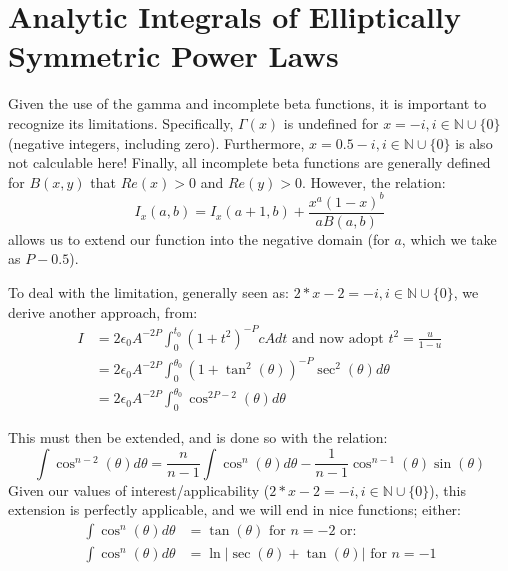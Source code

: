 \documentclass[twocolumn,traditabstract]{aa}
\begin{document}
\appendix

\section{Analytic Integrals of Elliptically Symmetric Power Laws}
\label{sec:analytic_integrals}

Given the use of the gamma and incomplete beta functions, it is important to recognize its limitations.
Specifically, $\Gamma(x)$ is undefined for $x = -i, i \in \mathbb{N} \cup \{0\}$ (negative integers, including
zero). Furthermore, $x = 0.5-i, i \in \mathbb{N} \cup \{0\}$ is also not calculable here! Finally, all incomplete
beta functions are generally defined for $B(x,y)$ that $Re(x) > 0$ and $Re(y) > 0$. However, the relation:
\begin{equation}
  I_x(a,b) = I_x(a+1,b) + \frac{x^a (1-x)^b}{a B(a,b)}
  \label{eqn:recibeta}
\end{equation}
allows us to extend our function into the negative domain (for $a$, which we take as $P-0.5$). 

To deal with the limitation, generally seen as: $2*x-2 = -i, i \in \mathbb{N} \cup \{0\}$, we derive another approach, from:
\begin{align}
  I &= 2 \epsilon_0 A^{-2P} \int_{0}^{t_0}(1+t^2)^{-P} c A dt \text{ and now adopt } t^2 = \frac{u}{1-u} \\
    &= 2 \epsilon_0 A^{-2P} \int_{0}^{\theta_0}(1+\tan^2(\theta))^{-P} \sec^2(\theta) d\theta \\
    &= 2 \epsilon_0 A^{-2P} \int_{0}^{\theta_0}\cos^{2P-2}(\theta) d\theta
\end{align}

This must then be extended, and is done so with the relation:
\begin{equation}
  \int \cos^{n-2}(\theta) d\theta = \frac{n}{n-1}\int \cos^n(\theta)d\theta - \frac{1}{n-1}\cos^{n-1}(\theta)\sin(\theta) 
  \label{eqn:cosext}
\end{equation}
Given our values of interest/applicability ($2*x-2 = -i, i \in \mathbb{N} \cup \{0\}$), this extension is perfectly
applicable, and we will end in nice functions; either:
\begin{align*}
  \int \cos^n(\theta)d\theta &= \tan(\theta) \text{ for } n=-2 \text{ or: } \\
  \int \cos^n(\theta)d\theta &= \ln \vert \sec(\theta) + \tan(\theta) \vert \text{ for } n=-1
\end{align*}
\end{document}
